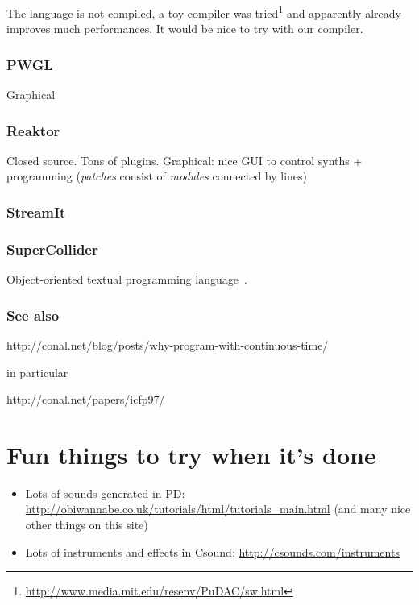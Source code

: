 \documentclass[a4paper,titlepage]{article}
\begin{document}
The language is not compiled, a toy compiler was
tried\footnote{\url{http://www.media.mit.edu/resenv/PuDAC/sw.html}} and
apparently already improves much performances. It would be nice to try with our compiler.

\subsubsection{PWGL}
\cite{pwgl}
Graphical

\subsubsection{Reaktor}
\cite{reaktor} Closed source. Tons of plugins. Graphical: nice GUI to control
synths + programming (\emph{patches} consist of \emph{modules} connected by
lines)

\subsubsection{StreamIt}
\cite{streamit}

\subsubsection{SuperCollider}
Object-oriented textual programming language~\cite{supercollider}.

\subsubsection{See also}
http://conal.net/blog/posts/why-program-with-continuous-time/

in particular

http://conal.net/papers/icfp97/

\section{Fun things to try when it's done}
\begin{itemize}
\item Lots of sounds generated in PD:
  \url{http://obiwannabe.co.uk/tutorials/html/tutorials_main.html}
  (and many nice other things on this site)
\item Lots of instruments and effects in Csound:
  \url{http://csounds.com/instruments}
\end{itemize}

\newpage


\end{document}
